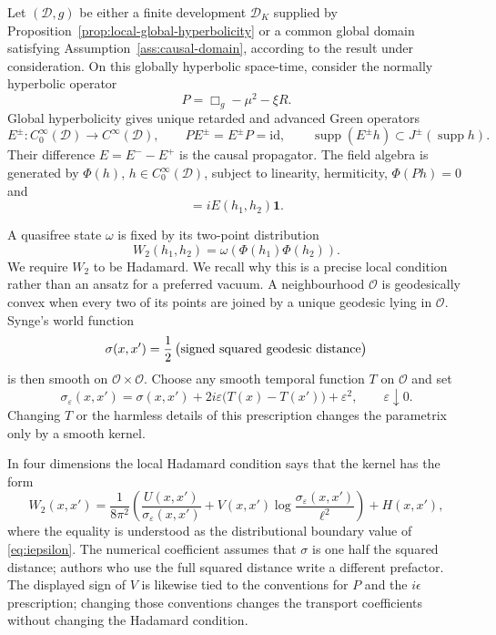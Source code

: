 \documentclass[11pt,a4paper]{article}
\theoremstyle{definition}
\theoremstyle{remark}
\newcommand{\D}{\mathcal D}
\newcommand{\Ocal}{\mathcal O}
\newcommand{\Cinf}{C_0^\infty}
\newcommand{\eps}{\varepsilon}
\newcommand{\supp}{\operatorname{supp}}
\begin{document}
	Let $(\D,g)$ be either a finite development $\D_K$ supplied by
	Proposition~\ref{prop:local-global-hyperbolicity} or a common global domain
	satisfying Assumption~\ref{ass:causal-domain}, according to the result under
	consideration.  On this globally hyperbolic space-time, consider the normally
	hyperbolic operator
	\begin{equation}
		P=\Box_g-\mu^2-\xi R.
		\label{eq:KG-operator}
	\end{equation}
	Global hyperbolicity gives unique retarded and advanced Green operators
	\begin{equation}
		E^\pm:\Cinf(\D)\longrightarrow C^\infty(\D),
		\qquad
		PE^\pm=E^\pm P=\mathrm{id},
		\qquad
		\supp(E^\pm h)\subset J^\pm(\supp h).
		\label{eq:Green-operators}
	\end{equation}
	Their difference $E=E^- -E^+$ is the causal propagator.  The field algebra is
	generated by $\Phi(h)$, $h\in\Cinf(\D)$, subject to linearity, hermiticity,
	$\Phi(Ph)=0$ and
	\begin{equation}
		[\Phi(h_1),\Phi(h_2)]=iE(h_1,h_2)\mathbf 1.
	\end{equation}
	
	A quasifree state $\omega$ is fixed by its two-point distribution
	\begin{equation}
		W_2(h_1,h_2)=\omega\!\left(\Phi(h_1)\Phi(h_2)\right).
	\end{equation}
	We require $W_2$ to be Hadamard.  We recall why this is a precise local
	condition rather than an ansatz for a preferred vacuum.  A neighbourhood
	$\Ocal$ is geodesically convex when every two of its points are joined by a
	unique geodesic lying in $\Ocal$.  Synge's world function
	\begin{equation}
		\sigma(x,x')=\frac12\,\bigl(\hbox{signed squared geodesic distance}
		\bigr)
	\end{equation}
	is then smooth on $\Ocal\times\Ocal$.  Choose any smooth temporal function
	$T$ on $\Ocal$ and set
	\begin{equation}
		\sigma_\eps(x,x')
		=\sigma(x,x')+2i\eps\bigl(T(x)-T(x')\bigr)+\eps^2,
		\qquad \eps\downarrow0.
		\label{eq:iepsilon}
	\end{equation}
	Changing $T$ or the harmless details of this prescription changes the
	parametrix only by a smooth kernel.
	
	In four dimensions the local Hadamard condition says that the kernel has the
	form
	\begin{equation}
		W_2(x,x')=
		\frac{1}{8\pi^2}
		\left(
		\frac{U(x,x')}{\sigma_\eps(x,x')}
		+V(x,x')\log\frac{\sigma_\eps(x,x')}{\ell^2}
		\right)
		+H(x,x'),
		\label{eq:Hadamard-form}
	\end{equation}
	where the equality is understood as the distributional boundary value of
	\eqref{eq:iepsilon}.  The numerical coefficient assumes that $\sigma$ is one
	half the squared distance; authors who use the full squared distance write a
	different prefactor.  The displayed sign of $V$ is likewise tied to the
	conventions for $P$ and the $i\epsilon$ prescription; changing those
	conventions changes the transport coefficients without changing the
	Hadamard condition.
	
\end{document}
